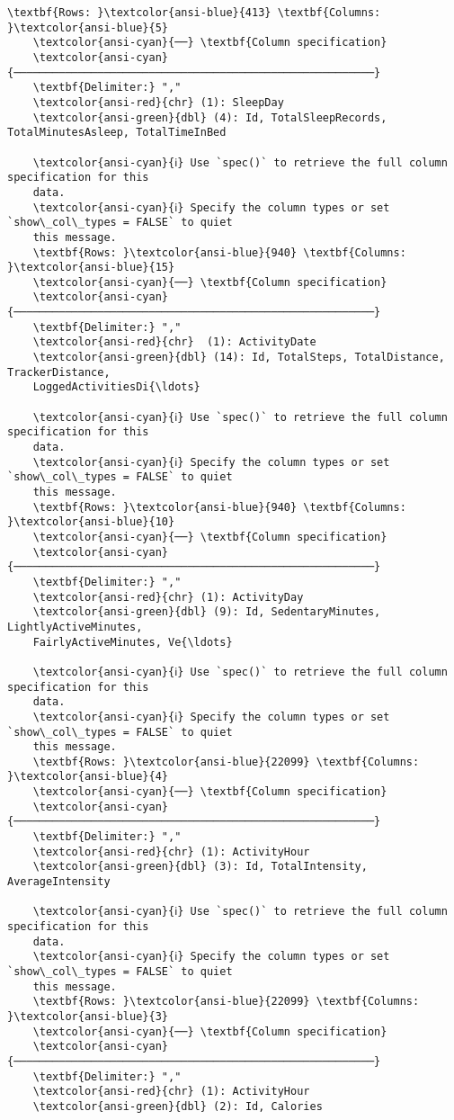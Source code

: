 \documentclass[11pt]{article}
\begin{document}
\begin{Verbatim}[commandchars=\\\{\}]
    \textbf{Rows: }\textcolor{ansi-blue}{413} \textbf{Columns: }\textcolor{ansi-blue}{5}
    \textcolor{ansi-cyan}{──} \textbf{Column specification}
    \textcolor{ansi-cyan}{────────────────────────────────────────────────────────}
    \textbf{Delimiter:} ","
    \textcolor{ansi-red}{chr} (1): SleepDay
    \textcolor{ansi-green}{dbl} (4): Id, TotalSleepRecords, TotalMinutesAsleep, TotalTimeInBed

    \textcolor{ansi-cyan}{ℹ} Use `spec()` to retrieve the full column specification for this
    data.
    \textcolor{ansi-cyan}{ℹ} Specify the column types or set `show\_col\_types = FALSE` to quiet
    this message.
    \textbf{Rows: }\textcolor{ansi-blue}{940} \textbf{Columns: }\textcolor{ansi-blue}{15}
    \textcolor{ansi-cyan}{──} \textbf{Column specification}
    \textcolor{ansi-cyan}{────────────────────────────────────────────────────────}
    \textbf{Delimiter:} ","
    \textcolor{ansi-red}{chr}  (1): ActivityDate
    \textcolor{ansi-green}{dbl} (14): Id, TotalSteps, TotalDistance, TrackerDistance,
    LoggedActivitiesDi{\ldots}

    \textcolor{ansi-cyan}{ℹ} Use `spec()` to retrieve the full column specification for this
    data.
    \textcolor{ansi-cyan}{ℹ} Specify the column types or set `show\_col\_types = FALSE` to quiet
    this message.
    \textbf{Rows: }\textcolor{ansi-blue}{940} \textbf{Columns: }\textcolor{ansi-blue}{10}
    \textcolor{ansi-cyan}{──} \textbf{Column specification}
    \textcolor{ansi-cyan}{────────────────────────────────────────────────────────}
    \textbf{Delimiter:} ","
    \textcolor{ansi-red}{chr} (1): ActivityDay
    \textcolor{ansi-green}{dbl} (9): Id, SedentaryMinutes, LightlyActiveMinutes,
    FairlyActiveMinutes, Ve{\ldots}

    \textcolor{ansi-cyan}{ℹ} Use `spec()` to retrieve the full column specification for this
    data.
    \textcolor{ansi-cyan}{ℹ} Specify the column types or set `show\_col\_types = FALSE` to quiet
    this message.
    \textbf{Rows: }\textcolor{ansi-blue}{22099} \textbf{Columns: }\textcolor{ansi-blue}{4}
    \textcolor{ansi-cyan}{──} \textbf{Column specification}
    \textcolor{ansi-cyan}{────────────────────────────────────────────────────────}
    \textbf{Delimiter:} ","
    \textcolor{ansi-red}{chr} (1): ActivityHour
    \textcolor{ansi-green}{dbl} (3): Id, TotalIntensity, AverageIntensity

    \textcolor{ansi-cyan}{ℹ} Use `spec()` to retrieve the full column specification for this
    data.
    \textcolor{ansi-cyan}{ℹ} Specify the column types or set `show\_col\_types = FALSE` to quiet
    this message.
    \textbf{Rows: }\textcolor{ansi-blue}{22099} \textbf{Columns: }\textcolor{ansi-blue}{3}
    \textcolor{ansi-cyan}{──} \textbf{Column specification}
    \textcolor{ansi-cyan}{────────────────────────────────────────────────────────}
    \textbf{Delimiter:} ","
    \textcolor{ansi-red}{chr} (1): ActivityHour
    \textcolor{ansi-green}{dbl} (2): Id, Calories


\end{Verbatim}
\end{document}
